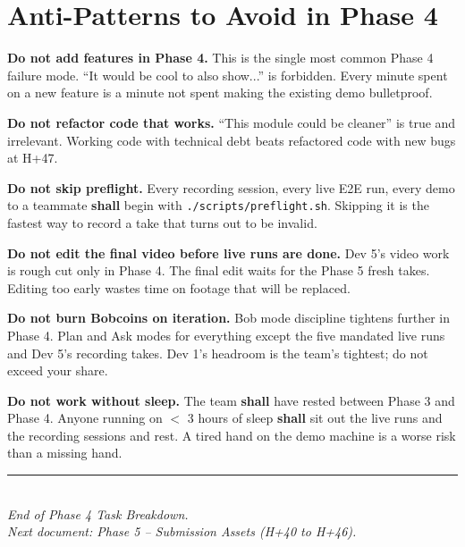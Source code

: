 \documentclass[11pt,letterpaper]{article}
\newcommand{\shall}{\textbf{shall}}
\begin{document}
\section{Anti-Patterns to Avoid in Phase 4}

\begin{danger}
\textbf{Do not add features in Phase 4.} This is the single most common Phase 4 failure mode. ``It would be cool to also show...'' is forbidden. Every minute spent on a new feature is a minute not spent making the existing demo bulletproof.
\end{danger}

\begin{warning}
\textbf{Do not refactor code that works.} ``This module could be cleaner'' is true and irrelevant. Working code with technical debt beats refactored code with new bugs at H+47.
\end{warning}

\begin{warning}
\textbf{Do not skip preflight.} Every recording session, every live E2E run, every demo to a teammate \shall{} begin with \texttt{./scripts/preflight.sh}. Skipping it is the fastest way to record a take that turns out to be invalid.
\end{warning}

\begin{warning}
\textbf{Do not edit the final video before live runs are done.} Dev 5's video work is rough cut only in Phase 4. The final edit waits for the Phase 5 fresh takes. Editing too early wastes time on footage that will be replaced.
\end{warning}

\begin{warning}
\textbf{Do not burn Bobcoins on iteration.} Bob mode discipline tightens further in Phase 4. Plan and Ask modes for everything except the five mandated live runs and Dev 5's recording takes. Dev 1's headroom is the team's tightest; do not exceed your share.
\end{warning}

\begin{warning}
\textbf{Do not work without sleep.} The team \shall{} have rested between Phase 3 and Phase 4. Anyone running on $<$ 3 hours of sleep \shall{} sit out the live runs and the recording sessions and rest. A tired hand on the demo machine is a worse risk than a missing hand.
\end{warning}

\vfill

\begin{center}
\rule{0.6\textwidth}{0.6pt}\\
\vspace{0.3em}
{\small\itshape\color{ibmgray} End of Phase 4 Task Breakdown.\\}
{\small\itshape\color{ibmgray} Next document: Phase 5 -- Submission Assets (H+40 to H+46).}
\end{center}
\end{document}
